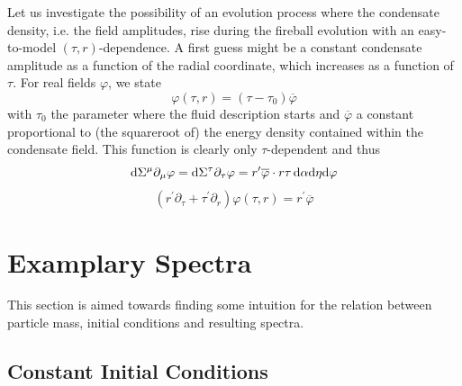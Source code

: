 Let us investigate the possibility of an evolution process where the condensate density, i.e. the field amplitudes, rise during the fireball evolution with an easy-to-model ${(\tau,r)}$-dependence. A first guess might be a constant condensate amplitude as a function of the radial coordinate, which increases as a function of $\tau$. For real fields $\varphi$, we state
\begin{equation}
    \varphi(\tau,r)=(\tau-\tau_0)\overline{\varphi}
\end{equation}
with $\tau_0$ the parameter where the fluid description starts and $\overline{\varphi}$ a constant proportional to (the squareroot of) the energy density contained within the condensate field. This function is clearly only $\tau$-dependent and thus 
\begin{equation}
    \text{d}\Sigma^\mu\partial_\mu\varphi=\text{d}\Sigma^\tau\partial_\tau\varphi=r^\prime\overline{\varphi}\cdot r\tau\,\text{d}\alpha\text{d}\eta\text{d}\varphi
\end{equation}
\begin{equation}
    (r^\prime\partial_\tau+\tau^\prime\partial_r)\varphi(\tau,r)=r^\prime\overline{\varphi}
\end{equation}

\section{Examplary Spectra}
\label{sec:ExampleSpectra}

This section is aimed towards finding some intuition for the relation between particle mass, initial conditions and resulting spectra.

\subsection{Constant Initial Conditions}

